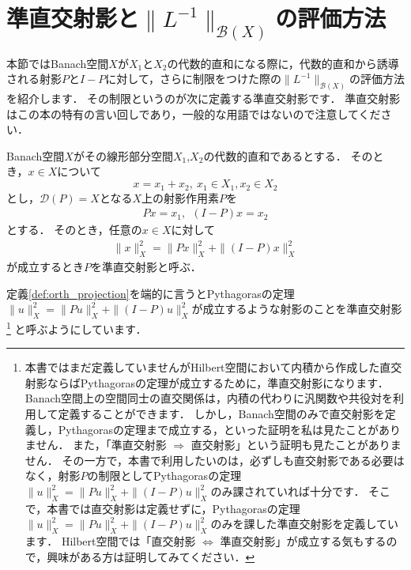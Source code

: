 %
\section{準直交射影と\texorpdfstring{$\| L^{-1} \|_{{\mathcal B}(X)}$}{||L-inverse||}の評価方法}
本節ではBanach空間$X$が$X_1$と$X_2$の代数的直和になる際に，代数的直和から誘導される射影$P$と$I -P$に対して，さらに制限をつけた際の$\| L^{-1} \|_{{\mathcal B}(X)}$の評価方法を紹介します．
その制限というのが次に定義する準直交射影です．
準直交射影はこの本の特有の言い回しであり，一般的な用語ではないので注意してください．

\begin{defi}[準直交射影]\label{def:orth_projection}
	Banach空間$X$がその線形部分空間$X_1$,$X_2$の代数的直和であるとする．
	そのとき，$x \in X$について
	\[
	x = x_1 + x_2, ~ x_1 \in X_1, x_2 \in X_2
	\]
	とし，${\mathcal D}(P) = X$となる$X$上の射影作用素$P$を
	\begin{align*}
		P x = x_1,~ ~ (I - P)x = x_2
	\end{align*}
	とする．
	そのとき，任意の$x \in X$に対して
	\begin{align*}
		\| x \|_{X}^2 = \| P x \|_{X}^2 + \| (I - P) x \|_{X}^2
	\end{align*}
	が成立するとき$P$を準直交射影と呼ぶ．
\end{defi}

定義\ref{def:orth_projection}を端的に言うとPythagorasの定理$\| u \|_{X}^2 = \| P u \|_{X}^2 + \| (I - P) u \|_{X}^2$が成立するような射影のことを準直交射影
\footnote{本書ではまだ定義していませんがHilbert空間において内積から作成した直交射影ならばPythagorasの定理が成立するために，準直交射影になります．
Banach空間上の空間同士の直交関係は，内積の代わりに汎関数や共役対を利用して定義することができます．
しかし，Banach空間のみで直交射影を定義し，Pythagorasの定理まで成立する，といった証明を私は見たことがありません．
また，「準直交射影 $\Rightarrow$ 直交射影」という証明も見たことがありません．
その一方で，本書で利用したいのは，必ずしも直交射影である必要はなく，射影$P$の制限としてPythagorasの定理$\| u \|_{X}^2 = \| P u \|_{X}^2 + \| (I - P) u \|_{X}^2$のみ課されていれば十分です．
そこで，本書では直交射影は定義せずに，Pythagorasの定理$\| u \|_{X}^2 = \| P u \|_{X}^2 + \| (I - P) u \|_{X}^2$のみを課した準直交射影を定義しています．
Hilbert空間では「直交射影 $\Leftrightarrow$ 準直交射影」が成立する気もするので，興味がある方は証明してみてください．}
と呼ぶようにしています．

